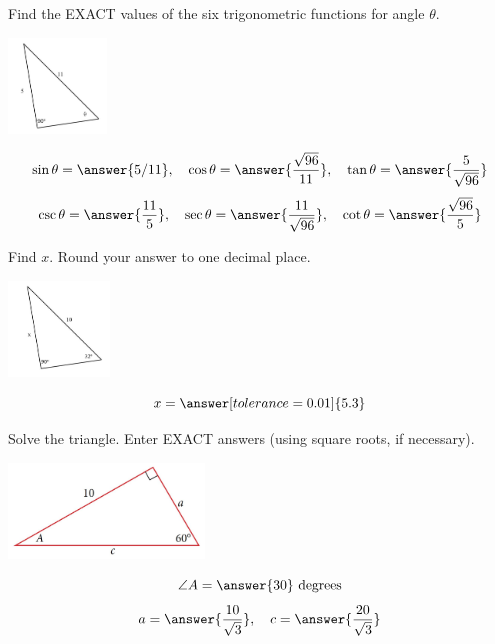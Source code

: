 \documentclass{ximera}
\begin{document}
\begin{problem}\label{prob:160hom10prob3}
Find the EXACT values of the six trigonometric functions for angle $\theta$. 
 
 \begin{image}
   
\includegraphics[height=1in]{160H10pic6.jpg}

\end{image}

$$\sin\theta=\answer{5/11},\quad \cos\theta=\answer{\frac{\sqrt{96}}{11}},\quad\tan\theta=\answer{\frac{5}{\sqrt{96}}}$$
$$\csc\theta=\answer{\frac{11}{5}},\quad\sec\theta=\answer{\frac{11}{\sqrt{96}}},\quad\cot\theta=\answer{\frac{\sqrt{96}}{5}}$$
\end{problem}

\begin{problem}\label{prob:160hom10prob4}
Find $x$.  Round your answer to one decimal place.
 
 \begin{image}
   
\includegraphics[height=1in]{160H10pic7.jpg}

\end{image}
$$x=\answer[tolerance=0.01]{5.3}$$
\end{problem}


\begin{problem}\label{prob:160hom10prob5}
Solve the triangle.  Enter EXACT answers (using square roots, if necessary).
\begin{image}
   
\includegraphics[height=1in]{160H10pic3.jpg}~
 
\end{image}

$$\angle A=\answer{30}\mbox{ degrees}$$
$$a=\answer{\frac{10}{\sqrt{3}}},\quad c=\answer{\frac{20}{\sqrt{3}}}$$
\end{problem}
\end{document}
